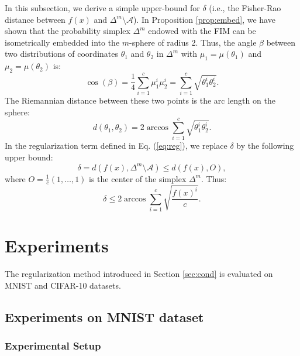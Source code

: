 \documentclass[entropy,article,submit,pdftex,moreauthors]{Definitions/mdpi}
\theoremstyle{plain}
\theoremstyle{definition}
\newcommand{\A}{\mathcal{A}}
\begin{document}
In this subsection, we derive a simple upper-bound for $\delta$ (i.e., the Fisher-Rao distance between $f(x)$ and $\Delta^m \setminus \A$). In Proposition \ref{prop:embed}, we have shown that the probability simplex $\Delta^m$ endowed with the FIM can be isometrically embedded into the $m$-sphere of radius 2. Thus, the angle $\beta$ between two distributions of coordinates $\theta_1$ and $\theta_2$ in $\Delta^m$ with $\mu_1=\mu(\theta_1)$ and $\mu_2=\mu(\theta_2)$ is:
\begin{equation*}
    \cos(\beta) = \frac{1}{4} \sum_{i=1}^c \mu_1^i \mu_2^i = \sum_{i=1}^c \sqrt{\theta_1^i \theta_2^i}.
\end{equation*}
The Riemannian distance between these two points is the arc length on the sphere:
\begin{equation*}
    d(\theta_1, \theta_2) = 2 \arccos \sum_{i=1}^c \sqrt{\theta_1^i \theta_2^i}.
\end{equation*}
In the regularization term defined in Eq. (\ref{eq:reg}), we replace $\delta$ by the following upper bound:
\begin{equation*}
    \delta = d\left(f(x), \Delta^m \setminus \A \right) \leq d\left(f(x), O\right),
\end{equation*}
where $O = \frac{1}{c}(1, \dots, 1)$ is the center of the simplex $\Delta^m$. Thus:
\begin{equation}
\label{delta}
    \delta \leq 2 \arccos \sum_{i=1}^c \sqrt{\frac{f(x)^i}{c}}.
\end{equation}


\section{Experiments}
\label{sec:exp}

The regularization method introduced in Section \ref{sec:cond} is evaluated on MNIST and CIFAR-10 datasets.

\subsection{Experiments on MNIST dataset}

\subsubsection{Experimental Setup}
\end{document}
